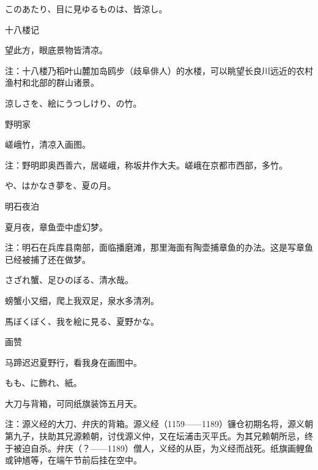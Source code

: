 \begin{haiku}
    {\FH このあたり、目に見ゆるものは、皆涼し。}

    {\FK 十八楼记}

    {\FK 望此方，眼底景物皆清凉。}

    {\FT 注：十八楼乃稻叶山麓加岛鸥步（歧阜俳人）的水楼，可以眺望长良川远近的农村渔村和北部的群山诸景。}
\end{haiku}

\begin{haiku}
    {\FH 涼しさを、絵にうつしけり、の竹。}

    {\FK 野明家}

    {\FK 嵯峨竹，清凉入画图。}

    {\FT 注：野明即奥西善六，居嵯峨，称坂井作大夫。嵯峨在京都市西部，多竹。}
\end{haiku}

\begin{haiku}
    {\FH {}や、はかなき夢を、夏の月。}

    {\FK 明石夜泊}

    {\FK 夏月夜，章鱼壶中虚幻梦。}

    {\FT 注：明石在兵库县南部，面临播磨滩，那里海面有陶壶捕章鱼的办法。这是写章鱼已经被捕了还在做梦。}
\end{haiku}

\begin{haiku}
    {\FH さざれ蟹、足ひのぼる、清水哉。}

    {\FK 螃蟹小又细，爬上我双足，泉水多清冽。}
\end{haiku}

\begin{haiku}
    {\FH 馬ぼくぼく、我を絵に見る、夏野かな。}

    {\FK 画赞}

    {\FK 马蹄迟迟夏野行，看我身在画图中。}
\end{haiku}

\begin{haiku}
    {\FH {}もも、に飾れ、紙。}

    {\FK 大刀与背箱，可同纸旗装饰五月天。}

    {\FT 注：源义经的大刀、弁庆的背箱。源义经（1159——1189）镰仓初期名将，源义朝第九子，扶助其兄源赖朝，讨伐源义仲，又在坛浦击灭平氏。为其兄赖朝所忌，终于被迫自杀。弁庆（？——1189）僧人，义经的从臣，为义经而战死。纸旗画鲤鱼或钟馗等，在端午节前后挂在空中。}
\end{haiku}

